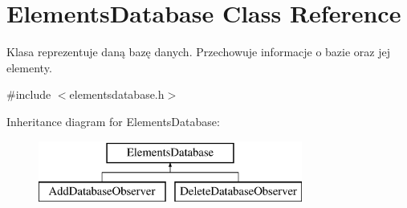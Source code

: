 \hypertarget{class_elements_database}{}\section{Elements\+Database Class Reference}
\label{class_elements_database}


Klasa reprezentuje daną bazę danych. Przechowuje informacje o bazie oraz jej elementy.  




{\ttfamily \#include $<$elementsdatabase.\+h$>$}

Inheritance diagram for Elements\+Database\+:\begin{figure}[H]
\begin{center}
\leavevmode
\includegraphics[height=2.000000cm]{class_elements_database}
\end{center}
\end{figure}
